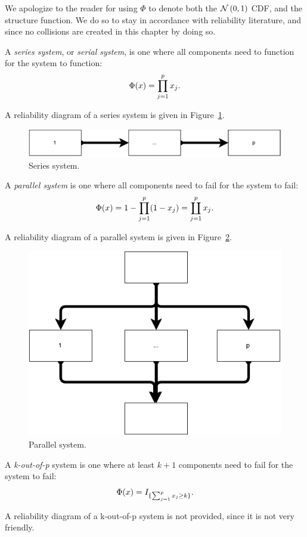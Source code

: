 \begin{remark}[$\Phi$]
We apologize to the reader for using $\Phi$ to denote both the $\mathcal{N}\left(0,1\right)$ CDF, and the structure function.
We do so to stay in accordance with reliability literature, and since no collisions are created in this chapter by doing so.
\end{remark}

\begin{definition}
A \emph{series system}, or \emph{serial system}, is one where all components need to function for the system to function: $$\Phi(x)=\prod_{j=1}^{p}x_j.$$
\end{definition}
A reliability diagram of a series system is given in Figure~\ref{fig:series_system}.
\begin{figure}[ht]
\centering
\includegraphics[width=0.5\linewidth]{art/series_system}
\caption{Series system.}
\label{fig:series_system}
\end{figure}


\begin{definition}
A \emph{parallel system} is one where all components need to fail for the system to fail:
$$\Phi(x)=1-\prod_{j=1}^{p} (1-x_j)= \coprod_{j=1}^p x_j.$$
\end{definition}
A reliability diagram of a parallel system is given in Figure~\ref{fig:parallel_system}.
\begin{figure}[ht]
\centering
\includegraphics[width=0.5\linewidth]{art/parallel_system}
\caption{Parallel system.}
\label{fig:parallel_system}
\end{figure}


\begin{definition}
A \emph{k-out-of-p} system is one where at least $k+1$ components need to fail for the system to fail:
$$\Phi(x)=I_{\{ \sum_{j=1}^{p} x_j \geq k \}}.$$
\end{definition}
A reliability diagram of a k-out-of-p system is not provided, since it is not very friendly.




